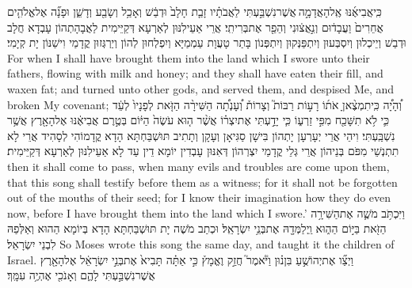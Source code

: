 {כִּֽי\maqqaf אֲבִיאֶ֜נּוּ אֶֽל\maqqaf הָאֲדָמָ֣ה \legarmeh  אֲשֶׁר\maqqaf נִשְׁבַּ֣עְתִּי לַאֲבֹתָ֗יו זָבַ֤ת חָלָב֙ וּדְבַ֔שׁ וְאָכַ֥ל וְשָׂבַ֖ע וְדָשֵׁ֑ן וּפָנָ֞ה אֶל\maqqaf אֱלֹהִ֤ים אֲחֵרִים֙ וַעֲבָד֔וּם וְנִ֣אֲצ֔וּנִי וְהֵפֵ֖ר אֶת\maqqaf בְּרִיתִֽי׃}
{אֲרֵי אַעֵילִנּוּן לְאַרְעָא דְּקַיֵּימִית לַאֲבָהָתְהוֹן עָבְדָא חֲלָב וּדְבַשׁ וְיֵיכְלוּן וְיִסְבְּעוּן וְיִתְפַּנְּקוּן וְיִתְפְּנוֹן בָּתַר טָעֲוָת עַמְמַיָּא וְיִפְלְחוּן לְהוֹן וְיַרְגְּזוּן קֳדָמַי וִישַׁנּוֹן יָת קְיָמִי׃}
{For when I shall have brought them into the land which I swore unto their fathers, flowing with milk and honey; and they shall have eaten their fill, and waxen fat; and turned unto other gods, and served them, and despised Me, and broken My covenant;}{}
{וְ֠הָיָ֠ה כִּֽי\maqqaf תִמְצֶ֨אןָ אֹת֜וֹ רָע֣וֹת רַבּוֹת֮ וְצָרוֹת֒ וְ֠עָנְתָ֠ה הַשִּׁירָ֨ה הַזֹּ֤את לְפָנָיו֙ לְעֵ֔ד כִּ֛י לֹ֥א תִשָּׁכַ֖ח מִפִּ֣י זַרְע֑וֹ כִּ֧י יָדַ֣עְתִּי אֶת\maqqaf יִצְר֗וֹ אֲשֶׁ֨ר ה֤וּא עֹשֶׂה֙ הַיּ֔וֹם בְּטֶ֣רֶם אֲבִיאֶ֔נּוּ אֶל\maqqaf הָאָ֖רֶץ אֲשֶׁ֥ר נִשְׁבַּֽעְתִּי׃}
{וִיהֵי אֲרֵי יְעָרְעָן יָתְהוֹן בִּישָׁן סַגִּיאָן וְעָקָן וְתָתִיב תּוּשְׁבַּחְתָּא הָדָא קֳדָמוֹהִי לְסָהִיד אֲרֵי לָא תִתְנְשֵׁי מִפֹּם בְּנֵיהוֹן אֲרֵי גְּלֵי קֳדָמַי יִצְרְהוֹן דְּאִנּוּן עָבְדִין יוֹמָא דֵין עַד לָא אַעֵילִנּוּן לְאַרְעָא דְּקַיֵּימִית׃}
{then it shall come to pass, when many evils and troubles are come upon them, that this song shall testify before them as a witness; for it shall not be forgotten out of the mouths of their seed; for I know their imagination how they do even now, before I have brought them into the land which I swore.’}{}
{וַיִּכְתֹּ֥ב מֹשֶׁ֛ה אֶת\maqqaf הַשִּׁירָ֥ה הַזֹּ֖את בַּיּ֣וֹם הַה֑וּא וַֽיְלַמְּדָ֖הּ אֶת\maqqaf בְּנֵ֥י יִשְׂרָאֵֽל׃}
{וּכְתַב מֹשֶׁה יָת תּוּשְׁבַּחְתָּא הָדָא בְּיוֹמָא הַהוּא וְאַלְּפַהּ לִבְנֵי יִשְׂרָאֵל׃}
{So Moses wrote this song the same day, and taught it the children of Israel.}{}
{וַיְצַ֞ו אֶת\maqqaf יְהוֹשֻׁ֣עַ בִּן\maqqaf נ֗וּן וַיֹּ֘אמֶר֮ חֲזַ֣ק וֶאֱמָץ֒ כִּ֣י אַתָּ֗ה תָּבִיא֙ אֶת\maqqaf בְּנֵ֣י יִשְׂרָאֵ֔ל אֶל\maqqaf הָאָ֖רֶץ אֲשֶׁר\maqqaf נִשְׁבַּ֣עְתִּי לָהֶ֑ם וְאָנֹכִ֖י אֶהְיֶ֥ה עִמָּֽךְ׃}
